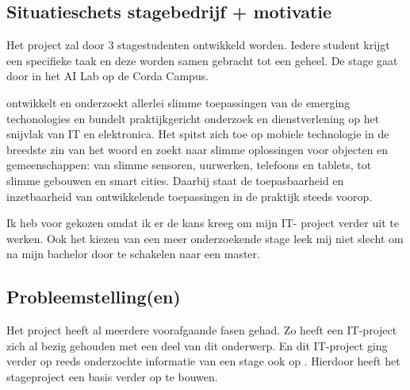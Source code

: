 \documentclass[a4paper]{article}
\begin{document}
    \subsection{Situatieschets stagebedrijf + motivatie}
      Het project zal door 3 stagestudenten ontwikkeld worden. Iedere student krijgt
      een specifieke taak en deze worden samen gebracht tot een geheel. De stage
      gaat door in het AI Lab op de Corda Campus.\par
      \stagebedrijf ontwikkelt en onderzoekt allerlei slimme toepassingen van de
      emerging techonologies en bundelt praktijkgericht onderzoek en dienstverlening
      op het snijvlak van IT en elektronica. Het spitst zich toe op mobiele technologie
      in de breedste zin van het woord en zoekt naar slimme oplossingen voor
      objecten en gemeenschappen: van slimme sensoren, uurwerken, telefoons en tablets,
      tot slimme gebouwen en smart cities. Daarbij staat de toepasbaarheid en
      inzetbaarheid van ontwikkelende toepassingen in de praktijk steeds voorop.\par
      Ik heb voor \stagebedrijf gekozen omdat ik er de kans kreeg om mijn IT-
      project verder uit te werken. Ook het kiezen van een meer onderzoekende stage
      leek mij niet slecht om na mijn bachelor door te schakelen naar een master.

      \newpage

    \subsection{Probleemstelling(en)}
      Het project heeft al meerdere voorafgaande fasen gehad. Zo heeft een IT-project
      zich al bezig gehouden met een deel van dit onderwerp. En dit IT-project ging
      verder op reeds onderzochte informatie van een stage ook op \stagebedrijf.
      Hierdoor heeft het stageproject een basis verder op te bouwen.
\end{document}

